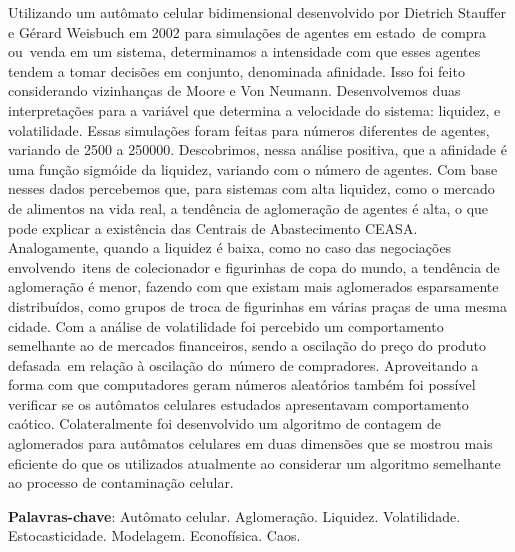 \documentclass[
	12pt,				%
	openright,			%
	twoside,			%
	a4paper,			%
	english,			%
	french,				%
	spanish,			%
	brazil				%
	]{abntex2}
\begin{document}
\setlength{\absparsep}{18pt} %
\begin{resumo}
  Utilizando um autômato celular bidimensional desenvolvido por Dietrich Stauffer e Gérard Weisbuch em 2002 para simulações de agentes em estado de compra ou venda em um sistema, determinamos a intensidade com que esses agentes tendem a tomar decisões em conjunto, denominada afinidade. Isso foi feito considerando vizinhanças de Moore e Von Neumann. Desenvolvemos duas interpretações para a variável que determina a velocidade do sistema: liquidez, e volatilidade. Essas simulações foram feitas para números diferentes de agentes, variando de 2500 a 250000. Descobrimos, nessa análise positiva, que a afinidade é uma função sigmóide da liquidez, variando com o número de agentes. Com base nesses dados percebemos que, para sistemas com alta liquidez, como o mercado de alimentos na vida real, a tendência de aglomeração de agentes é alta, o que pode explicar a existência das Centrais de Abastecimento CEASA. Analogamente, quando a liquidez é baixa, como no caso das negociações envolvendo itens de colecionador e figurinhas de copa do mundo, a tendência de aglomeração é menor, fazendo com que existam mais aglomerados esparsamente distribuídos, como grupos de troca de figurinhas em várias praças de uma mesma cidade. Com a análise de volatilidade foi percebido um comportamento semelhante ao de mercados financeiros, sendo a oscilação do preço do produto defasada em relação à oscilação do número de compradores. Aproveitando a forma com que computadores geram números aleatórios também foi possível verificar se os autômatos celulares estudados apresentavam comportamento caótico. Colateralmente foi desenvolvido um algoritmo de contagem de aglomerados para autômatos celulares em duas dimensões que se mostrou mais eficiente do que os utilizados atualmente ao considerar um algoritmo semelhante ao processo de contaminação celular.

 \textbf{Palavras-chave}: Autômato celular. Aglomeração. Liquidez. Volatilidade. Estocasticidade. Modelagem. Econofísica. Caos.
\end{resumo}
\end{document}
